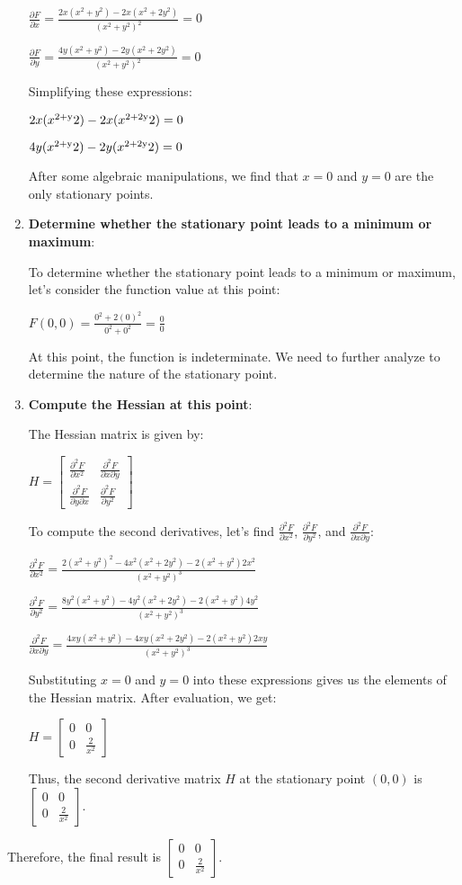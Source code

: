 \documentclass[11pt]{article}
\begin{document}
\begin{enumerate}
  $ \frac{\partial F}{\partial x} =
  \frac{2x(x^2+y^2) - 2x(x^2+2y^2)}{(x^2+y^2)^2} = 0 $

  $ \frac{\partial F}{\partial y} =
  \frac{4y(x^2+y^2) - 2y(x^2+2y^2)}{(x^2+y^2)^2} = 0 $

  Simplifying these expressions:

  $ 2x(x\textsuperscript{2+y}2) - 2x(x\textsuperscript{2+2y}2) = 0 $

  $ 4y(x\textsuperscript{2+y}2) - 2y(x\textsuperscript{2+2y}2) = 0 $

  After some algebraic manipulations, we find that $ x = 0 $ and $ y
  = 0 $ are the only stationary points.
\item
  \textbf{Determine whether the stationary point leads to a minimum or
  maximum}:

  To determine whether the stationary point leads to a minimum or
  maximum, let's consider the function value at this point:

  $ F(0,0) = \frac{0^2 + 2(0)^2}{0^2 + 0^2} = \frac{0}{0} $

  At this point, the function is indeterminate. We need to further
  analyze to determine the nature of the stationary point.
\item
  \textbf{Compute the Hessian at this point}:

  The Hessian matrix is given by:

  $ H =
  \begin{bmatrix} \frac{\partial^2 F}{\partial x^2} & \frac{\partial^2 F}{\partial x \partial y} \\ \frac{\partial^2 F}{\partial y \partial x} & \frac{\partial^2 F}{\partial y^2} \end{bmatrix}
  $

  To compute the second derivatives, let's find $
  \frac{\partial^2 F}{\partial x^2} $, $
  \frac{\partial^2 F}{\partial y^2} $, and $
  \frac{\partial^2 F}{\partial x \partial y} $:

  $ \frac{\partial^2 F}{\partial x^2} =
  \frac{2(x^2+y^2)^2 - 4x^2(x^2+2y^2) - 2(x^2+y^2)2x^2}{(x^2+y^2)^3} $

  $ \frac{\partial^2 F}{\partial y^2} =
  \frac{8y^2(x^2+y^2) - 4y^2(x^2+2y^2) - 2(x^2+y^2)4y^2}{(x^2+y^2)^3} $

  $ \frac{\partial^2 F}{\partial x \partial y} =
  \frac{4xy(x^2+y^2) - 4xy(x^2+2y^2) - 2(x^2+y^2)2xy}{(x^2+y^2)^3} $

  Substituting $ x = 0 $ and $ y = 0 $ into these expressions gives
  us the elements of the Hessian matrix. After evaluation, we get:

  $ H = \begin{bmatrix} 0 & 0 \\ 0 & \frac{2}{x^2} \end{bmatrix} $

  Thus, the second derivative matrix $ H $ at the stationary point $
  (0, 0) $ is $ \begin{bmatrix} 0 & 0 \\ 0 & \frac{2}{x^2} \end{bmatrix} $.
\end{enumerate}

Therefore, the final result is $\begin{bmatrix} 0 & 0 \\ 0 & \frac{2}{x^2} \end{bmatrix}$.


    
    
    
\end{document}
